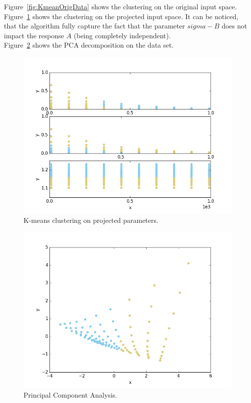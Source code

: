 Figure~\ref{fig:KmeanOrigData} shows the clustering on the original
input space.
\\Figure~\ref{fig:KmeanProjected} shows the clustering on the projected
input space. It can be noticed, that the algorithm fully capture the fact
that the parameter $sigma-B$ does not impact the response $A$ (being completely independent).
\\Figure~\ref{fig:PCAplot} shows the PCA decomposition on the data set.
 \begin{figure}[h!]
  \centering
  \includegraphics[scale=0.7]{../../tests/framework/user_guide/DataMining/gold/dataMiningAnalysis/1-PlotKMeans1_dataMining-dataMining-dataMining.png}
  \caption{K-means clustering on projected parameters.}
  \label{fig:KmeanProjected}
 \end{figure}

 \begin{figure}[h!]
  \centering
  \includegraphics[scale=0.7]{../../tests/framework/user_guide/DataMining/gold/dataMiningAnalysis/1-PlotPCA1_dataMining.png}
  \caption{Principal Component Analysis.}
  \label{fig:PCAplot}
 \end{figure}

